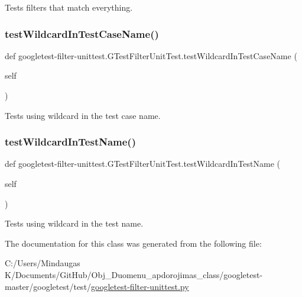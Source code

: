 \begin{DoxyVerb}Tests filters that match everything.\end{DoxyVerb}
 \mbox{\label{classgoogletest-filter-unittest_1_1_g_test_filter_unit_test_a6bc13581aeb86a199706fd2592b5b5e5}} 
\subsubsection{\texorpdfstring{testWildcardInTestCaseName()}{testWildcardInTestCaseName()}}
{\footnotesize\ttfamily def googletest-\/filter-\/unittest.\+G\+Test\+Filter\+Unit\+Test.\+test\+Wildcard\+In\+Test\+Case\+Name (\begin{DoxyParamCaption}\item[{}]{self }\end{DoxyParamCaption})}

\begin{DoxyVerb}Tests using wildcard in the test case name.\end{DoxyVerb}
 \mbox{\label{classgoogletest-filter-unittest_1_1_g_test_filter_unit_test_a57c51a39e4e5578dc6e0a0dd47c2875c}} 
\subsubsection{\texorpdfstring{testWildcardInTestName()}{testWildcardInTestName()}}
{\footnotesize\ttfamily def googletest-\/filter-\/unittest.\+G\+Test\+Filter\+Unit\+Test.\+test\+Wildcard\+In\+Test\+Name (\begin{DoxyParamCaption}\item[{}]{self }\end{DoxyParamCaption})}

\begin{DoxyVerb}Tests using wildcard in the test name.\end{DoxyVerb}
 

The documentation for this class was generated from the following file\+:\begin{DoxyCompactItemize}
\item 
C\+:/\+Users/\+Mindaugas K/\+Documents/\+Git\+Hub/\+Obj\+\_\+\+Duomenu\+\_\+apdorojimas\+\_\+class/googletest-\/master/googletest/test/\mbox{\hyperlink{googletest-master_2googletest_2test_2googletest-filter-unittest_8py}{googletest-\/filter-\/unittest.\+py}}\end{DoxyCompactItemize}
